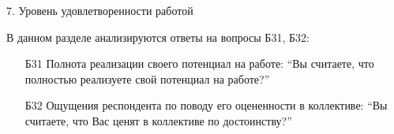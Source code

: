 \begin{frame}{7. Уровень удовлетворенности работой}

\tiny

В данном разделе анализируются ответы на вопросы Б31, Б32:
\bigskip

\begin{itemize}

\item [Б31]Полнота реализации своего потенциал на работе: ``Вы считаете, что полностью реализуете свой потенциал на работе?''

\item [Б32] Ощущения респондента по поводу его оцененности в коллективе: ``Вы считаете, что Вас ценят в коллективе по достоинству?''

\end{itemize}

\end{frame}



